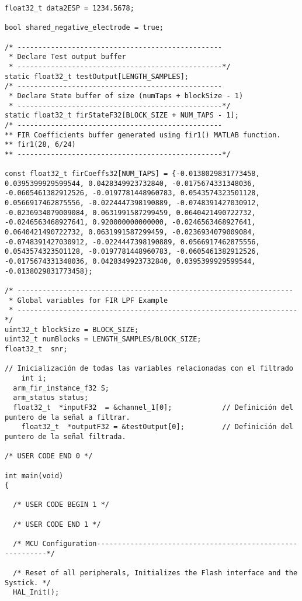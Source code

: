 \begin{lstlisting}[label=algoritmo:STM32F4:main.c,style = STM-code,frame=single,caption=STM32F4:main.c]
float32_t data2ESP = 1234.5678;

bool shared_negative_electrode = true;

/* -------------------------------------------------
 * Declare Test output buffer
 * -------------------------------------------------*/
static float32_t testOutput[LENGTH_SAMPLES];
/* -------------------------------------------------
 * Declare State buffer of size (numTaps + blockSize - 1)
 * -------------------------------------------------*/
static float32_t firStateF32[BLOCK_SIZE + NUM_TAPS - 1];
/* -------------------------------------------------
** FIR Coefficients buffer generated using fir1() MATLAB function.
** fir1(28, 6/24)
** -------------------------------------------------*/

const float32_t firCoeffs32[NUM_TAPS] = {-0.0138029831773458, 0.0395399929599544, 0.0428349923732840, -0.0175674331348036, -0.0605461382912526, -0.0197781448960783, 0.0543574323501128, 0.0566917462875556, -0.0224447398190889, -0.0748391427030912, -0.0236934079009084, 0.0631991587299459, 0.0640421490722732, -0.0246563468927641, 0.920000000000000, -0.0246563468927641, 0.0640421490722732, 0.0631991587299459, -0.0236934079009084, -0.0748391427030912, -0.0224447398190889, 0.0566917462875556, 0.0543574323501128, -0.0197781448960783, -0.0605461382912526, -0.0175674331348036, 0.0428349923732840, 0.0395399929599544, -0.0138029831773458};

/* ------------------------------------------------------------------
 * Global variables for FIR LPF Example
 * ------------------------------------------------------------------- */
uint32_t blockSize = BLOCK_SIZE;
uint32_t numBlocks = LENGTH_SAMPLES/BLOCK_SIZE;
float32_t  snr;
	
// Inicialización de todas las variables relacionadas con el filtrado
	int i;
  arm_fir_instance_f32 S;
  arm_status status;
  float32_t  *inputF32 	= &channel_1[0];			// Definición del puntero de la señal a filtrar.
	float32_t  *outputF32 = &testOutput[0];			// Definición del puntero de la señal filtrada.

/* USER CODE END 0 */

int main(void)
{

  /* USER CODE BEGIN 1 */
	
  /* USER CODE END 1 */

  /* MCU Configuration----------------------------------------------------------*/

  /* Reset of all peripherals, Initializes the Flash interface and the Systick. */
  HAL_Init();


\end{lstlisting}
